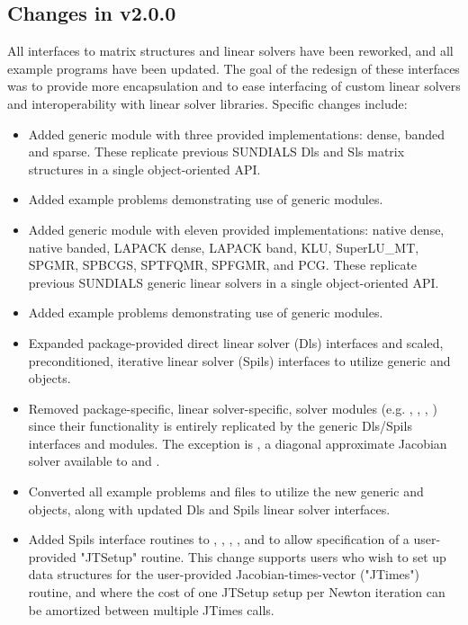 \subsection*{Changes in v2.0.0}

All interfaces to matrix structures and linear solvers 
have been reworked, and all example programs have been updated. 
The goal of the redesign of these interfaces was to provide more encapsulation
and to ease interfacing of custom linear solvers and interoperability 
with linear solver libraries.
Specific changes include:
\begin{itemize}
\item Added generic {\sunmatrix} module with three provided implementations:
        dense, banded and sparse.  These replicate previous SUNDIALS Dls and
        Sls matrix structures in a single object-oriented API.
\item Added example problems demonstrating use of generic {\sunmatrix} modules.
\item Added generic  module with eleven provided
        implementations: {\sundials} native dense, {\sundials} native banded, 
        LAPACK dense, LAPACK band, KLU,
        SuperLU\_MT, SPGMR, SPBCGS, SPTFQMR, SPFGMR, and PCG.  These replicate
        previous SUNDIALS generic linear solvers in a single object-oriented
        API.
\item Added example problems demonstrating use of generic 
        modules.
\item Expanded package-provided direct linear solver (Dls) interfaces and
        scaled, preconditioned, iterative linear solver (Spils) interfaces
        to utilize generic {\sunmatrix} and  objects.
\item Removed package-specific, linear solver-specific, solver modules
        (e.g. , , , ) since their functionality
        is entirely replicated by the generic Dls/Spils interfaces and
         modules.  The exception is , a
        diagonal approximate Jacobian solver available to {\cvode} and {\cvodes}.
\item Converted all {\sundials} example problems and files to utilize the new generic
        {\sunmatrix} and  objects, along with updated Dls and
        Spils linear solver interfaces.
\item Added Spils interface routines to {\arkode}, {\cvode}, {\cvodes}, {\ida},
        and {\idas} to allow specification of a user-provided "JTSetup" routine.
        This change supports users who wish to set up data structures for
        the user-provided Jacobian-times-vector ("JTimes") routine, and
        where the cost of one JTSetup setup per Newton iteration can be
        amortized between multiple JTimes calls.
\end{itemize}

